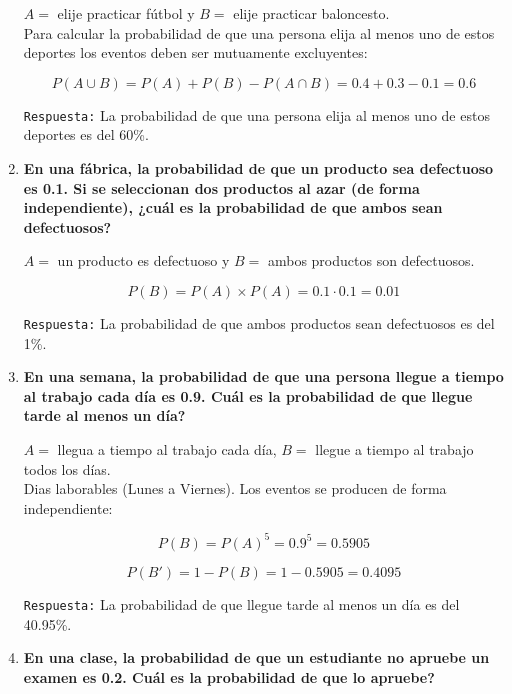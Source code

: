 \documentclass[12pt]{article}
\begin{document}
\begin{enumerate}[label=\textbf{\arabic*.}]
        $A = $ elije practicar fútbol y $B = $ elije practicar baloncesto.\\

        Para calcular la probabilidad de que una persona elija al menos uno de estos deportes 
        los eventos deben ser mutuamente excluyentes:

        \[P(A \cup B) = P(A) + P(B) - P(A \cap B) = 0.4 + 0.3 - 0.1 = 0.6\]

        \texttt{Respuesta:} La probabilidad de que una persona elija al menos uno de estos deportes es del 60\%.



        \item \textbf{En una fábrica, la probabilidad de que un producto sea defectuoso es 0.1. Si se seleccionan dos 
        productos al azar (de forma independiente), ¿cuál es la probabilidad de que ambos sean defectuosos?}

        $A = $ un producto es defectuoso y $B = $ ambos productos son defectuosos.

        \[P(B) = P(A) \times P(A) = 0.1 \cdot 0.1 = 0.01\]

        \texttt{Respuesta:} La probabilidad de que ambos productos sean defectuosos es del 1\%.
        


        \newpage
        \item \textbf{En una semana, la probabilidad de que una persona llegue a tiempo al trabajo
        cada día es 0.9. \textquestiondown Cuál es la probabilidad de que llegue tarde al menos un día?}

        $A = $ llegua a tiempo al trabajo cada día, $B = $ llegue a tiempo al trabajo todos los días.\\

        Dias laborables (Lunes a Viernes). Los eventos se producen de forma independiente:

        \[P(B) = P(A)^{5} = 0.9^{5} = 0.5905\]

        \[P(B') = 1 - P(B) = 1 - 0.5905 = 0.4095\]

        \texttt{Respuesta:} La probabilidad de que llegue tarde al menos un día es del 40.95\%.
        
        

        \item \textbf{En una clase, la probabilidad de que un estudiante no apruebe un examen es
        0.2. \textquestiondown Cuál es la probabilidad de que lo apruebe?}


\end{enumerate}
\end{document}
